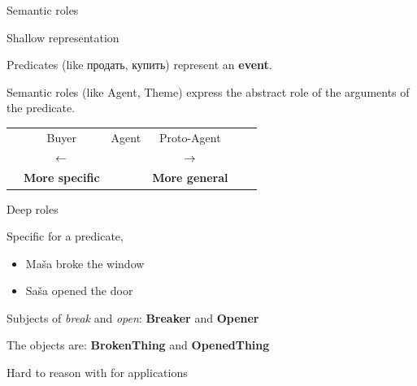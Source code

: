 \documentclass[10pt, compress]{beamer}
\begin{document}
\begin{frame}[standout]
  Semantic roles
\end{frame}


\begin{frame}{Shallow representation}

Predicates (like продать, купить) represent an \textbf{event}.

Semantic roles (like Agent, Theme) express the abstract role of the arguments of the predicate.


\begin{center}
\begin{tabular}{cccccc}
              & {\Large Buyer}        &  {\Large Agent} & {\Large Proto-Agent}      &   \\
              & $ {\Large \leftarrow}$ &                 & $ {\Large \rightarrow} $  &  \\
              & \textbf{More specific} &                  &  \textbf{More general}   &
  
\end{tabular}
\end{center}

\end{frame}

\begin{frame}{Deep roles}

Specific for a predicate,

\begin{itemize}
  \item Maša broke the window 
  \item Saša opened the door
\end{itemize}

Subjects of \emph{break} and \emph{open}: {\bf Breaker} and {\bf Opener}

The objects are: {\bf BrokenThing} and {\bf OpenedThing}

Hard to reason with for applications

\end{frame}
\end{document}
